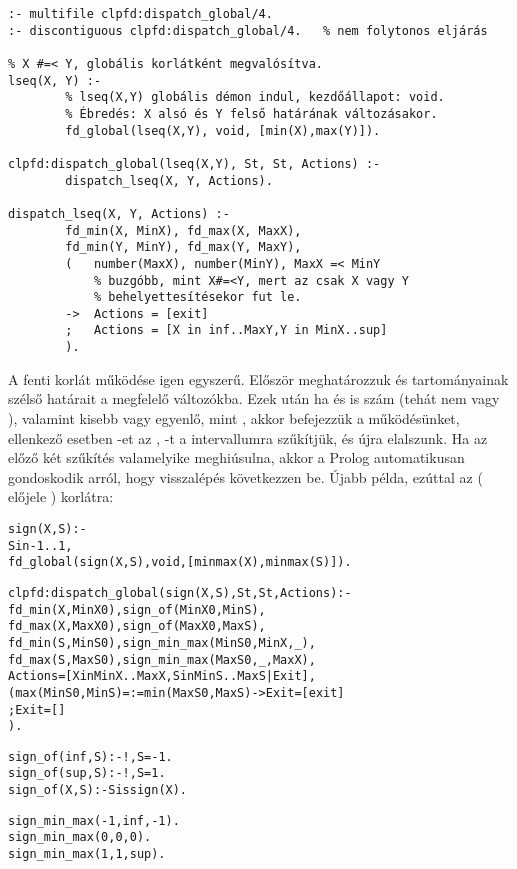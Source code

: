 \begin{verbatim}
:- multifile clpfd:dispatch_global/4.
:- discontiguous clpfd:dispatch_global/4.   % nem folytonos eljárás

% X #=< Y, globális korlátként megvalósítva.
lseq(X, Y) :-
        % lseq(X,Y) globális démon indul, kezdőállapot: void.
        % Ébredés: X alsó és Y felső határának változásakor.
        fd_global(lseq(X,Y), void, [min(X),max(Y)]).

clpfd:dispatch_global(lseq(X,Y), St, St, Actions) :-
        dispatch_lseq(X, Y, Actions).

dispatch_lseq(X, Y, Actions) :-
        fd_min(X, MinX), fd_max(X, MaxX),
        fd_min(Y, MinY), fd_max(Y, MaxY),
        (   number(MaxX), number(MinY), MaxX =< MinY
            % buzgóbb, mint X#=<Y, mert az csak X vagy Y
            % behelyettesítésekor fut le.
        ->  Actions = [exit]
        ;   Actions = [X in inf..MaxY,Y in MinX..sup]
        ).
\end{verbatim}

A fenti korlát működése igen egyszerű. Először meghatározzuk  és  tartományainak
szélső határait a megfelelő változókba. Ezek után ha  és  is szám
(tehát nem  vagy ), valamint  kisebb vagy egyenlő, mint ,
akkor befejezzük a működésünket, ellenkező esetben -et az , -t
a  intervallumra szűkítjük, és újra elalszunk. Ha az előző két szűkítés
valamelyike meghiúsulna, akkor a Prolog automatikusan gondoskodik arról, hogy visszalépés
következzen be.
\br
Újabb példa, ezúttal az  ( előjele ) korlátra:

\begin{alltt}
% X előjele S, globális korlátként megvalósítva.
sign(X, S) :-
        S in -1..1,
        fd_global(sign(X,S), void, [minmax(X),minmax(S)]).
        % Ébredés: X és S alsó és felső határának változásakor.

clpfd:dispatch_global(sign(X,S), St, St, Actions) :-
        fd_min(X, MinX0), sign_of(MinX0, MinS),
        fd_max(X, MaxX0), sign_of(MaxX0, MaxS),
        fd_min(S, MinS0), sign_min_max(MinS0, MinX, _),
        fd_max(S, MaxS0), sign_min_max(MaxS0, _, MaxX),
        Actions = [X in MinX..MaxX, S in MinS..MaxS|Exit],
        (   max(MinS0,MinS)=:=min(MaxS0,MaxS) -> Exit = [exit]
        ;   Exit = []
        ).

% sign_of(X, S): X egész vagy végtelen érték előjele S
sign_of(inf, S) :- !, S = -1.
sign_of(sup, S) :- !, S = 1.
sign_of(X, S) :- S is sign(X).

% sign_min_max(S, Min, Max): \(sign(x)=\cd{S} \Leftrightarrow x \in \cd{Min..Max}\)
sign_min_max(-1, inf, -1).
sign_min_max(0, 0, 0).
sign_min_max(1, 1, sup).
\end{alltt}

